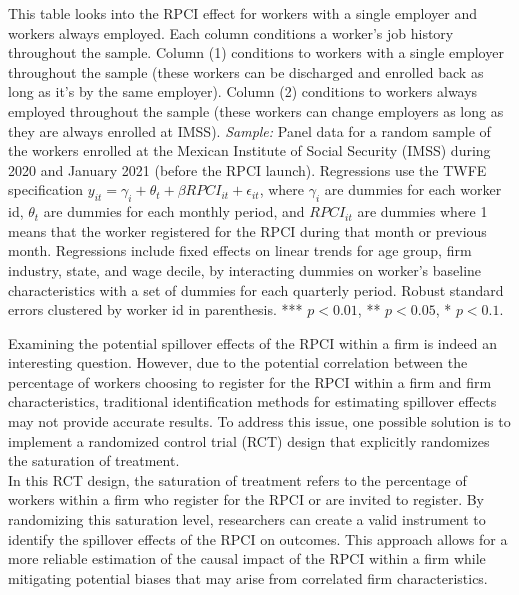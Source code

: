 \documentclass[10pt, oneside]{book}
\begin{document}
\scriptsize{
\noindent This table looks into the RPCI effect for workers with a single employer and workers always employed. Each column conditions a worker's job history throughout the sample. Column (1) conditions to workers with a single employer throughout the sample (these workers can be discharged and enrolled back as long as it's by the same employer). Column (2) conditions to workers always employed throughout the sample (these workers can change employers as long as they are always enrolled at IMSS). \textit{Sample:} Panel data for a random sample of the workers enrolled at the Mexican Institute of Social Security (IMSS) during 2020 and January 2021 (before the RPCI launch). Regressions use the TWFE specification $y_{it} = \gamma_{i} + \theta_{t}+ \beta RPCI_{it} +\epsilon_{it}$, where $\gamma_{i}$ are dummies for each worker id, $\theta_{t}$ are dummies for each monthly period, and $RPCI_{it}$ are dummies where 1 means that the worker registered for the RPCI during that month or previous month. Regressions include fixed effects on linear trends for age group, firm industry, state, and wage decile, by interacting dummies on worker's baseline characteristics with a set of dummies for each quarterly period. Robust standard errors clustered by worker id in parenthesis. *** $p<0.01$, ** $p<0.05$, * $p<0.1$.
} \\

\normalsize

Examining the potential spillover effects of the RPCI within a firm is indeed an interesting question. However, due to the potential correlation between the percentage of workers choosing to register for the RPCI within a firm and firm characteristics, traditional identification methods for estimating spillover effects may not provide accurate results. To address this issue, one possible solution is to implement a randomized control trial (RCT) design that explicitly randomizes the saturation of treatment. \\

In this RCT design, the saturation of treatment refers to the percentage of workers within a firm who register for the RPCI or are invited to register. By randomizing this saturation level, researchers can create a valid instrument to identify the spillover effects of the RPCI on outcomes. This approach allows for a more reliable estimation of the causal impact of the RPCI within a firm while mitigating potential biases that may arise from correlated firm characteristics. \\
\end{document}
